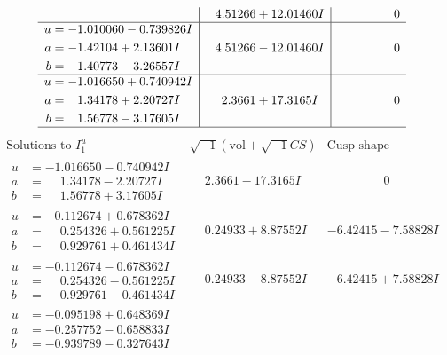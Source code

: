 \documentclass[1p]{elsarticle_modified}
\theoremstyle{definition}
\newcommand{\I}{\sqrt{-1}}
\begin{document}
$$\begin{array}{c|c|c}
 & \phantom{-}4.51266 + 12.01460 I & \phantom{-0.000000 } 0 \\ \hline\begin{aligned}
u &= -1.010060 - 0.739826 I \\
a &= -1.42104 + 2.13601 I \\
b &= -1.40773 - 3.26557 I\end{aligned}
 & \phantom{-}4.51266 - 12.01460 I & \phantom{-0.000000 } 0 \\ \hline\begin{aligned}
u &= -1.016650 + 0.740942 I \\
a &= \phantom{-}1.34178 + 2.20727 I \\
b &= \phantom{-}1.56778 - 3.17605 I\end{aligned}
 & \phantom{-}2.3661 + 17.3165 I & \phantom{-0.000000 } 0\\
 \hline 
 \end{array}$$\newpage$$\begin{array}{c|c|c}  
\text{Solutions to }I^u_{1}& \I (\text{vol} + \sqrt{-1}CS) & \text{Cusp shape}\\
 \hline 
\begin{aligned}
u &= -1.016650 - 0.740942 I \\
a &= \phantom{-}1.34178 - 2.20727 I \\
b &= \phantom{-}1.56778 + 3.17605 I\end{aligned}
 & \phantom{-}2.3661 - 17.3165 I & \phantom{-0.000000 } 0 \\ \hline\begin{aligned}
u &= -0.112674 + 0.678362 I \\
a &= \phantom{-}0.254326 + 0.561225 I \\
b &= \phantom{-}0.929761 + 0.461434 I\end{aligned}
 & \phantom{-}0.24933 + 8.87552 I & -6.42415 - 7.58828 I \\ \hline\begin{aligned}
u &= -0.112674 - 0.678362 I \\
a &= \phantom{-}0.254326 - 0.561225 I \\
b &= \phantom{-}0.929761 - 0.461434 I\end{aligned}
 & \phantom{-}0.24933 - 8.87552 I & -6.42415 + 7.58828 I \\ \hline\begin{aligned}
u &= -0.095198 + 0.648369 I \\
a &= -0.257752 - 0.658833 I \\
b &= -0.939789 - 0.327643 I\end{aligned}

\end{array}$$
\end{document}

